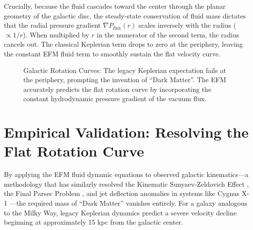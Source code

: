 \documentclass[11pt, a4paper, table]{article}
\begin{document}
  Crucially, because the fluid cascades toward the center through the planar geometry of the galactic disc, the steady-state conservation of fluid mass dictates that the radial pressure gradient $\nabla P_{\text{flux}}(r)$ scales inversely with the radius ($\propto 1/r$). When multiplied by $r$ in the numerator of the second term, the radius cancels out. The classical Keplerian term drops to zero at the periphery, leaving the constant EFM fluid term to smoothly sustain the flat velocity curve.

\begin{figure}[!ht]
    \centering
    \caption{Galactic Rotation Curves: The legacy Keplerian expectation fails at the periphery, prompting the invention of ``Dark Matter''. The EFM accurately predicts the flat rotation curve by incorporating the constant hydrodynamic pressure gradient of the vacuum flux.}
    \label{fig:rotation-curve}
  \end{figure}

\section{Empirical Validation: Resolving the Flat Rotation Curve}
  By applying the EFM fluid dynamic equations to observed galactic kinematics---a methodology that has similarly resolved the Kinematic Sunyaev-Zeldovich Effect \cite{marabut2026m7}, the Final Parsec Problem \cite{marabut2026m9}, and jet deflection anomalies in systems like Cygnus X-1 \cite{marabut2026m3}---the required mass of ``Dark Matter'' vanishes entirely. For a galaxy analogous to the Milky Way, legacy Keplerian dynamics predict a severe velocity decline beginning at approximately 15 kpc from the galactic center. 
  
\end{document}

